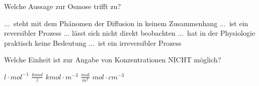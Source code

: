 \documentclass[11pt]{exam}
\begin{document}
\begin{questions}
\vspace{3mm}\question Welche Aussage zur Osmose trifft zu?

\begin{choices}
	\choice ... steht mit dem Phänomen der Diffusion in keinem Zusammenhang
	\choice ... ist ein reversibler Prozess
	\choice ... lässt sich nicht direkt beobachten
	\choice ... hat in der Physiologie praktisch keine Bedeutung
	\choice ... ist ein irreversibler Prozess
\end{choices}

\vspace{3mm}\question Welche Einheit ist zur Angabe von Konzentrationen NICHT möglich?

\begin{choices}
	\choice \( l \cdot mol^{-1} \)
	\choice \( \frac{kmol}{l} \)
	\choice \( kmol \cdot m^{-3} \)
	\choice \( \frac{mol}{m^3} \)
	\choice \( mol \cdot cm^{-3} \)
\end{choices}

\vspace{3mm}\end{questions}
\end{document}
